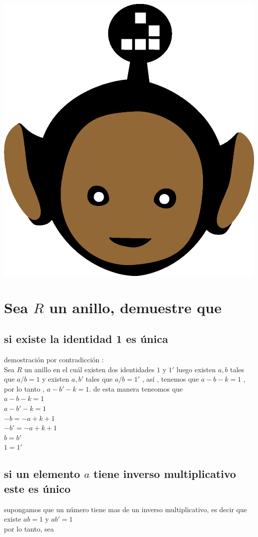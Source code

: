 \documentclass[10pt,a4paper]{article} %
\begin{document}
    \title{\rmfamily\normalfont{}}
    \author{}
    \date{\today}

    \maketitle


    \includegraphics[width=0.1\linewidth]{negro_cara.png}
    \section{Sea $ R  $ un anillo, demuestre que }
        \subsection{si existe la identidad 1 es única}

            demostración por contradicción :
            \\ Sea $ R  $ un anillo en el cuál existen dos identidades $ 1  $ y
            $ 1'  $ luego existen $ a,b   $ tales que $ a/b = 1  $ y existen $
            a,b'  $ tales que $ a/b = 1 '  $  , así , tenemos que $ a - b - k =
            1  $ , por lo tanto , $ a -b' - k = 1  $. de esta manera teneomos que
            \\ $ a - b -k = 1  $
            \\ $ a - b' -k = 1  $
            \\ $ -b  = -a + k + 1  $
            \\ $ -b'  = -a + k + 1  $
            \\ $ b = b'  $
            \\ $ 1 = 1'  $

        \subsection{si un elemento $ a  $ tiene inverso multiplicativo este es
        único}
           supongamos que un número tiene mas de un inverso multiplicativo, es
           decir que existe $ a b = 1  $ y $ ab' = 1  $
           \\ por lo tanto, sea
\end{document}
